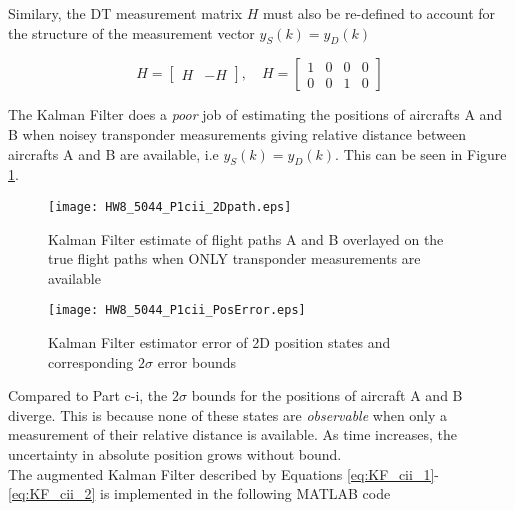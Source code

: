 \documentclass[]{article}
\begin{document}
\noindent Similary, the DT measurement matrix $H$ must also be re-defined to account for the structure of the measurement vector $y_S(k)=y_D(k)$

\begin{equation}
H = \left[\begin{array}{cc}H & -H\end{array}\right],\quad
H = \left[\begin{array}{cccc}1 & 0 & 0 & 0\\0 & 0 & 1 & 0\end{array}\right]
\label{eq:KF_cii_2}
\end{equation}

\noindent The Kalman Filter does a \textit{poor} job of estimating the positions of aircrafts A and B when noisey transponder measurements giving relative distance between aircrafts A and B are available, i.e $y_S(k)=y_D(k)$. This can be seen in Figure \ref{fig:HW8_5044_P1cii_2Dpath}.

\begin{figure}[H]
	\begin{center}  
		\texttt{[image: HW8\_5044\_P1cii\_2Dpath.eps]}  
		\caption{Kalman Filter estimate of flight paths A and B overlayed on the true flight paths when ONLY transponder measurements are available}
		\label{fig:HW8_5044_P1cii_2Dpath}
	\end{center}  
\end{figure}

\begin{figure}[H]
	\begin{center}  
		\texttt{[image: HW8\_5044\_P1cii\_PosError.eps]}  
		\caption{Kalman Filter estimator error of 2D position states and corresponding $2\sigma$ error bounds}
		\label{fig:HW8_5044_P1cii_PosError}
	\end{center}  
\end{figure}

\noindent Compared to Part c-i, the $2\sigma$ bounds for the positions of aircraft A and B diverge. This is because none of these states are \textit{observable} when only a measurement of their relative distance is available. As time increases, the uncertainty in absolute position grows without bound.\\

\noindent The augmented Kalman Filter described by Equations \ref{eq:KF_cii_1}-\ref{eq:KF_cii_2} is implemented in the following MATLAB code
\end{document}
